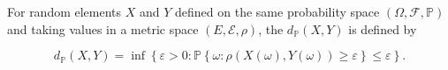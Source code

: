 For random elements $X$ and $Y$ defined on the same probability space $(\Omega, \mathcal{F}, \mathbb{P})$ and taking values in a metric space $(E, \mathcal{E}, \rho)$, the  $d_{\mathbb{P}}(X, Y)$ is defined by

$$d_{\mathbb{P}}(X, Y) = \inf \left\{ \varepsilon > 0 : \mathbb{P}\left\{\omega : \rho(X(\omega), Y(\omega)) \geq \varepsilon\right\} \leq \varepsilon \right\}.$$